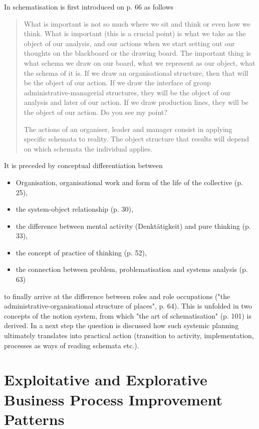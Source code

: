 \documentclass[11pt,a4paper]{article}
\begin{document}
In \cite{MSM} schematisation is first introduced on p. 66 as follows
\begin{quote}  
  What is important is not so much where we sit and think or even how we
  think.  What is important (this is a crucial point) is what we take as the
  object of our analysis, and our actions when we start setting out our
  thoughts on the blackboard or the drawing board. The important thing is what
  schema we draw on our board, what we represent as our object, what the
  schema of it is. If we draw an organisational structure, then that will be
  the object of our action. If we draw the interface of group
  administrative-managerial structures, they will be the object of our
  analysis and later of our action. If we draw production lines, they will be
  the object of our action. Do you see my point?

  The actions of an organiser, leader and manager consist in applying specific
  schemata to reality. The object structure that results will depend on which
  schemata the individual applies.
\end{quote}
It is preceded by conceptual differentiation between
\begin{itemize}
\item Organisation, organisational work and form of the life of the collective
  (p. 25),
\item the system-object relationship (p. 30),
\item the difference between mental activity (Denktätigkeit) and pure thinking
  (p. 33),
\item the concept of practice of thinking (p. 52),
\item the connection between problem, problematisation and systems analysis
  (p. 63)
\end{itemize}
to finally arrive at the difference between roles and role occupations ("the
administrative-organisational structure of places", p. 64). This is unfolded
in two concepts of the notion system, from which "the art of schematisation"
(p. 101) is derived. In a next step the question is discussed how such
systemic planning ultimately translates into practical action (transition to
activity, implementation, processes as ways of reading schemata etc.).

\section{Exploitative and Explorative Business Process Improvement Patterns}
\end{document}
